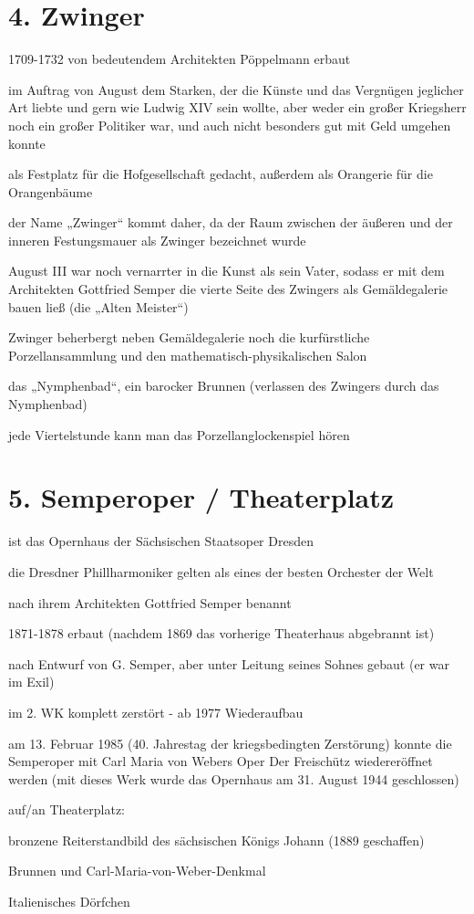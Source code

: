 \documentclass[a4paper,12pt]{report}
\begin{document}
\section{4. Zwinger}
\begin{itemize*}
\item 1709-1732 von bedeutendem Architekten Pöppelmann erbaut
\item im Auftrag von August dem Starken, der die Künste und das Vergnügen jeglicher Art liebte und gern wie Ludwig XIV sein wollte, aber weder ein großer Kriegsherr noch ein großer Politiker war, und auch nicht besonders gut mit Geld umgehen konnte
\item als Festplatz für die Hofgesellschaft gedacht, außerdem als Orangerie für die Orangenbäume
\item der Name „Zwinger“ kommt daher, da der Raum zwischen der äußeren und der inneren Festungsmauer als Zwinger bezeichnet wurde
\item August III war noch vernarrter in die Kunst als sein Vater, sodass er mit dem Architekten Gottfried Semper die vierte Seite des Zwingers als Gemäldegalerie bauen ließ (die „Alten Meister“)
\item Zwinger beherbergt neben Gemäldegalerie noch die kurfürstliche Porzellansammlung und den mathematisch-physikalischen Salon
\item das „Nymphenbad“, ein barocker Brunnen (verlassen des Zwingers durch das Nymphenbad)
\item jede Viertelstunde kann man das Porzellanglockenspiel hören
\end{itemize*}

\section{5. Semperoper / Theaterplatz}
\begin{itemize*}
\item ist das Opernhaus der Sächsischen Staatsoper Dresden
\item die Dresdner Phillharmoniker gelten als eines der besten Orchester der Welt
\item nach ihrem Architekten Gottfried Semper benannt
\item 1871-1878 erbaut (nachdem 1869 das vorherige Theaterhaus abgebrannt ist)
\item nach Entwurf von G. Semper, aber unter Leitung seines Sohnes gebaut (er war im Exil)
\item im 2. WK komplett zerstört - ab 1977 Wiederaufbau
\item am 13. Februar 1985 (40. Jahrestag der kriegsbedingten Zerstörung) konnte die Semperoper mit Carl Maria von Webers Oper Der Freischütz wiedereröffnet werden (mit dieses Werk wurde das Opernhaus am 31. August 1944 geschlossen)
\item auf/an Theaterplatz:
    \begin{itemize*}
    \item bronzene Reiterstandbild des sächsischen Königs Johann (1889 geschaffen)
    \item Brunnen und Carl-Maria-von-Weber-Denkmal
    \item Italienisches Dörfchen
    \end{itemize*}
\end{itemize*}
\end{document}
